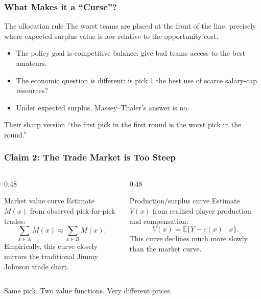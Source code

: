 \documentclass[aspectratio=169,professionalfonts]{beamer}
\newcommand{\E}{\mathbb{E}}
\newcommand{\slidecite}[1]{\vspace{0.5mm}{\scriptsize\hfill #1}}
\begin{document}
\begin{frame}
\frametitle{What Makes it a ``Curse''?}
\begin{block}{The allocation rule}
The worst teams are placed at the front of the line, precisely where expected surplus value is low relative to the opportunity cost.
\end{block}

\vspace{1mm}
\begin{itemize}
  \item The policy goal is competitive balance: give bad teams access to the best amateurs.
  \item The economic question is different: is pick 1 the best use of scarce salary-cap resources?
  \item Under expected surplus, Massey--Thaler's answer is no.
\end{itemize}

\vspace{2mm}
\begin{block}{Their sharp version}
\centering
\Large
``the first pick in the first round is the worst pick in the round.''
\slidecite{Massey and Thaler (2013)}
\end{block}
\end{frame}

\begin{frame}
\frametitle{Claim 2: The Trade Market is Too Steep}
\begin{columns}[T,totalwidth=\textwidth]
\begin{column}{0.48\textwidth}
\begin{block}{Market value curve}
Estimate $M(x)$ from observed pick-for-pick trades:
\[
  \sum_{x\in A} M(x) \approx \sum_{x\in B} M(x).
\]
Empirically, this curve closely mirrors the traditional Jimmy Johnson trade chart.
\end{block}
\end{column}
\begin{column}{0.48\textwidth}
\begin{block}{Production/surplus curve}
Estimate $V(x)$ from realized player production and compensation:
\[
  V(x) = \E\{Y-c(x)\mid x\}.
\]
This curve declines much more slowly than the market curve.
\end{block}
\end{column}
\end{columns}

\vspace{2mm}
\centering
\alert{Same pick. Two value functions. Very different prices.}
\end{frame}
\end{document}

